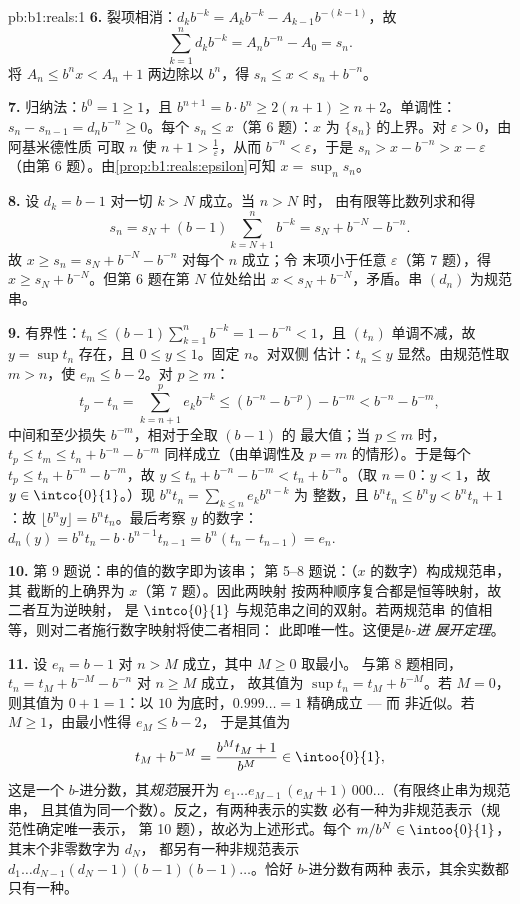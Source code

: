 \begin{solution}{pb:b1:reals:1}
\textbf{6.} 裂项相消：$d_k b^{-k} = A_k b^{-k} - A_{k-1}
b^{-(k-1)}$，故
\[
\sum_{k=1}^n d_k b^{-k} = A_n b^{-n} - A_0 = s_n .
\]
将 $A_n \leq b^n x < A_n + 1$ 两边除以 $b^n$，得 $s_n \leq x <
s_n + b^{-n}$。

\textbf{7.} 归纳法：$b^0 = 1 \geq 1$，且 $b^{n+1} = b \cdot
b^n \geq 2(n + 1) \geq n + 2$。单调性：$s_n - s_{n-1} = d_n
b^{-n} \geq 0$。每个 $s_n \leq x$（第 6 题）：$x$ 为
$\{s_n\}$ 的上界。对 $\varepsilon > 0$，由阿基米德性质
可取 $n$ 使 $n + 1 > \frac1\varepsilon$，从而
$b^{-n} < \varepsilon$，于是 $s_n > x - b^{-n} > x -
\varepsilon$（由第 6 题）。由\cref{prop:b1:reals:epsilon}可知 $x =
\sup_n s_n$。

\textbf{8.} 设 $d_k = b - 1$ 对一切 $k > N$ 成立。当 $n > N$ 时，
由有限等比数列求和得
\[
s_n = s_N + (b - 1)\sum_{k=N+1}^{n} b^{-k}
= s_N + b^{-N} - b^{-n} .
\]
故 $x \geq s_n = s_N + b^{-N} - b^{-n}$ 对每个 $n$ 成立；令
末项小于任意 $\varepsilon$（第 7 题），得 $x
\geq s_N + b^{-N}$。但第 6 题在第 $N$ 位处给出 $x < s_N +
b^{-N}$，矛盾。串 $(d_n)$ 为规范串。

\textbf{9.} 有界性：$t_n \leq (b-1)\sum_{k=1}^n b^{-k} = 1 -
b^{-n} < 1$，且 $(t_n)$ 单调不减，故 $y = \sup t_n$
存在，且 $0 \leq y \leq 1$。固定 $n$。对双侧
估计：$t_n \leq y$ 显然。由规范性取 $m > n$，使
$e_m \leq b - 2$。对 $p \geq m$：
\[
t_p - t_n = \sum_{k=n+1}^{p} e_k b^{-k}
\leq (b^{-n} - b^{-p}) - b^{-m} < b^{-n} - b^{-m},
\]
中间和至少损失 $b^{-m}$，相对于全取 $(b-1)$ 的
最大值；当 $p \leq m$ 时，$t_p \leq t_m \leq t_n + b^{-n} -
b^{-m}$ 同样成立（由单调性及 $p = m$ 的情形）。于是每个
$t_p \leq t_n + b^{-n} - b^{-m}$，故 $y \leq t_n + b^{-n} -
b^{-m} < t_n + b^{-n}$。（取 $n = 0$：$y < 1$，故 $y \in
\intco{0}{1}$。）现 $b^n t_n = \sum_{k \leq n} e_k b^{n-k}$ 为
整数，且 $b^n t_n \leq b^n y < b^n t_n + 1$：故 $\lfloor b^n
y \rfloor = b^n t_n$。最后考察 $y$ 的数字：$d_n(y) = b^n
t_n - b \cdot b^{n-1} t_{n-1} = b^n(t_n - t_{n-1}) = e_n$.

\textbf{10.} 第 9 题说：串的值的数字即为该串；
第 5--8 题说：（$x$ 的数字）构成规范串，其
截断的上确界为 $x$（第 7 题）。因此两映射
按两种顺序复合都是恒等映射，故二者互为逆映射，
是 $\intco{0}{1}$ 与规范串之间的双射。若两规范串
的值相等，则对二者施行数字映射将使二者相同：
此即唯一性。这便是\emph{$b$-进
展开定理}。

\textbf{11.} 设 $e_n = b - 1$ 对 $n > M$ 成立，其中 $M \geq 0$ 取最小。
与第 8 题相同，$t_n = t_M + b^{-M} - b^{-n}$ 对 $n \geq M$ 成立，
故其值为 $\sup t_n = t_M + b^{-M}$。若 $M = 0$，
则其值为 $0 + 1 = 1$：以 $10$ 为底时，$0.999\dots = 1$ 精确成立 --- 而
非近似。若 $M \geq 1$，由最小性得 $e_M \leq b - 2$，
于是其值为
\[
t_M + b^{-M} = \frac{b^M t_M + 1}{b^M} \in \intoo{0}{1},
\]
这是一个 $b$-进分数，其\emph{规范}展开为 $e_1 \dots
e_{M-1}\,(e_M + 1)\,000\dots$（有限终止串为规范串，
且其值为同一个数）。反之，有两种表示的实数
必有一种为非规范表示（规范性确定唯一表示，
第 10 题），故必为上述形式。每个
$m/b^N \in \intoo{0}{1}$，其末个非零数字为 $d_N$，
都另有一种非规范表示 $d_1 \dots d_{N-1}(d_N -
1)(b-1)(b-1)\dots$。恰好 $b$-进分数有两种
表示，其余实数都只有一种。


\end{solution}
